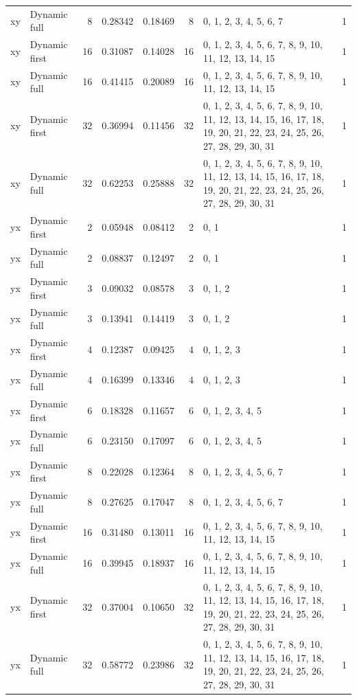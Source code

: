 \documentclass[10pt,a4paper]{article}
\begin{document}
\begin{longtable}{@{}p{23mm}p{29mm}rrrrp{36mm}r@{}}
xy & Dynamic full & 8 & 0.28342 & 0.18469 & 8 & 0, 1, 2, 3, 4, 5, 6, 7 & 1 \\
xy & Dynamic first & 16 & 0.31087 & 0.14028 & 16 & 0, 1, 2, 3, 4, 5, 6, 7, 8, 9, 10, 11, 12, 13, 14, 15 & 1 \\
xy & Dynamic full & 16 & 0.41415 & 0.20089 & 16 & 0, 1, 2, 3, 4, 5, 6, 7, 8, 9, 10, 11, 12, 13, 14, 15 & 1 \\
xy & Dynamic first & 32 & 0.36994 & 0.11456 & 32 & 0, 1, 2, 3, 4, 5, 6, 7, 8, 9, 10, 11, 12, 13, 14, 15, 16, 17, 18, 19, 20, 21, 22, 23, 24, 25, 26, 27, 28, 29, 30, 31 & 1 \\
xy & Dynamic full & 32 & 0.62253 & 0.25888 & 32 & 0, 1, 2, 3, 4, 5, 6, 7, 8, 9, 10, 11, 12, 13, 14, 15, 16, 17, 18, 19, 20, 21, 22, 23, 24, 25, 26, 27, 28, 29, 30, 31 & 1 \\
yx & Dynamic first & 2 & 0.05948 & 0.08412 & 2 & 0, 1 & 1 \\
yx & Dynamic full & 2 & 0.08837 & 0.12497 & 2 & 0, 1 & 1 \\
yx & Dynamic first & 3 & 0.09032 & 0.08578 & 3 & 0, 1, 2 & 1 \\
yx & Dynamic full & 3 & 0.13941 & 0.14419 & 3 & 0, 1, 2 & 1 \\
yx & Dynamic first & 4 & 0.12387 & 0.09425 & 4 & 0, 1, 2, 3 & 1 \\
yx & Dynamic full & 4 & 0.16399 & 0.13346 & 4 & 0, 1, 2, 3 & 1 \\
yx & Dynamic first & 6 & 0.18328 & 0.11657 & 6 & 0, 1, 2, 3, 4, 5 & 1 \\
yx & Dynamic full & 6 & 0.23150 & 0.17097 & 6 & 0, 1, 2, 3, 4, 5 & 1 \\
yx & Dynamic first & 8 & 0.22028 & 0.12364 & 8 & 0, 1, 2, 3, 4, 5, 6, 7 & 1 \\
yx & Dynamic full & 8 & 0.27625 & 0.17047 & 8 & 0, 1, 2, 3, 4, 5, 6, 7 & 1 \\
yx & Dynamic first & 16 & 0.31480 & 0.13011 & 16 & 0, 1, 2, 3, 4, 5, 6, 7, 8, 9, 10, 11, 12, 13, 14, 15 & 1 \\
yx & Dynamic full & 16 & 0.39945 & 0.18937 & 16 & 0, 1, 2, 3, 4, 5, 6, 7, 8, 9, 10, 11, 12, 13, 14, 15 & 1 \\
yx & Dynamic first & 32 & 0.37004 & 0.10650 & 32 & 0, 1, 2, 3, 4, 5, 6, 7, 8, 9, 10, 11, 12, 13, 14, 15, 16, 17, 18, 19, 20, 21, 22, 23, 24, 25, 26, 27, 28, 29, 30, 31 & 1 \\
yx & Dynamic full & 32 & 0.58772 & 0.23986 & 32 & 0, 1, 2, 3, 4, 5, 6, 7, 8, 9, 10, 11, 12, 13, 14, 15, 16, 17, 18, 19, 20, 21, 22, 23, 24, 25, 26, 27, 28, 29, 30, 31 & 1 \\
\end{longtable}\normalsize\setlength{\tabcolsep}{6pt}
\clearpage
\end{document}
